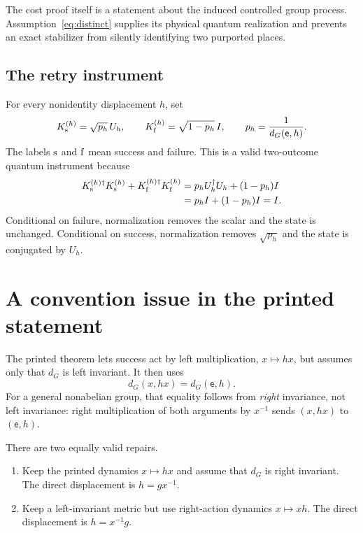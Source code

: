 \documentclass[11pt]{article}
\theoremstyle{definition}
\theoremstyle{remark}
\newcommand{\id}{\mathsf e}
\begin{document}
The cost proof itself is a statement about the induced controlled group
process.  Assumption~\eqref{eq:distinct} supplies its physical quantum
realization and prevents an exact stabilizer from silently identifying two
purported places.

\subsection{The retry instrument}

For every nonidentity displacement \(h\), set
\begin{equation}
  K^{(h)}_{\rm s}=\sqrt{p_h}\,U_h,
  \qquad
  K^{(h)}_{\rm f}=\sqrt{1-p_h}\,I,
  \qquad
  p_h=\frac{1}{d_G(\id,h)}.
  \label{eq:retry}
\end{equation}
The labels \({\rm s}\) and \({\rm f}\) mean success and failure.  This is a
valid two-outcome quantum instrument because
\begin{align}
 K_{\rm s}^{(h)\dagger}K_{\rm s}^{(h)}
 +K_{\rm f}^{(h)\dagger}K_{\rm f}^{(h)}
 &=p_hU_h^\dagger U_h+(1-p_h)I\\
 &=p_hI+(1-p_h)I=I.
 \label{eq:complete}
\end{align}
Conditional on failure, normalization removes the scalar and the state is
unchanged. Conditional on success, normalization removes \(\sqrt{p_h}\) and
the state is conjugated by \(U_h\).

\section{A convention issue in the printed statement}

The printed theorem lets success act by left multiplication,
\(x\mapsto hx\), but assumes only that \(d_G\) is left invariant. It then
uses
\[
 d_G(x,hx)=d_G(\id,h).
\]
For a general nonabelian group, that equality follows from \emph{right}
invariance, not left invariance: right multiplication of both arguments by
\(x^{-1}\) sends \((x,hx)\) to \((\id,h)\).

There are two equally valid repairs.

\begin{enumerate}
\item Keep the printed dynamics \(x\mapsto hx\) and assume that \(d_G\) is
right invariant. The direct displacement is \(h=gx^{-1}\).
\item Keep a left-invariant metric but use right-action dynamics
\(x\mapsto xh\). The direct displacement is \(h=x^{-1}g\).
\end{enumerate}
\end{document}
